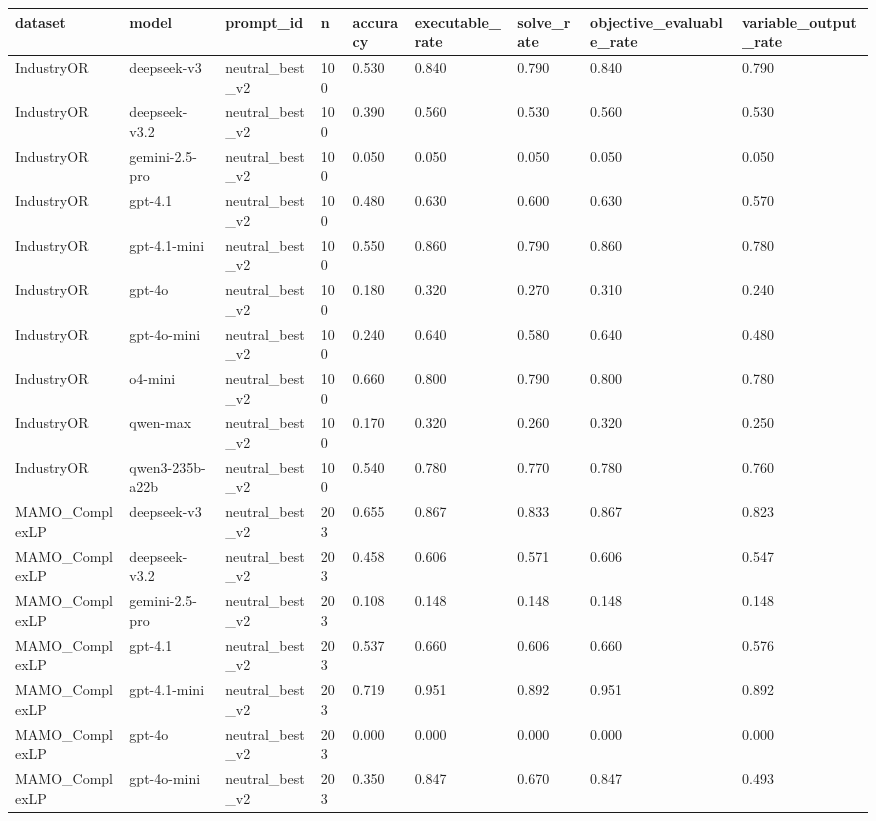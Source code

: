 \begin{table}[t]
\centering
\small
\begin{tabular}{lllllllll}
\toprule
dataset & model & prompt\_id & n & accuracy & executable\_rate & solve\_rate & objective\_evaluable\_rate & variable\_output\_rate \\
\midrule
IndustryOR & deepseek-v3 & neutral\_best\_v2 & 100 & 0.530 & 0.840 & 0.790 & 0.840 & 0.790 \\
IndustryOR & deepseek-v3.2 & neutral\_best\_v2 & 100 & 0.390 & 0.560 & 0.530 & 0.560 & 0.530 \\
IndustryOR & gemini-2.5-pro & neutral\_best\_v2 & 100 & 0.050 & 0.050 & 0.050 & 0.050 & 0.050 \\
IndustryOR & gpt-4.1 & neutral\_best\_v2 & 100 & 0.480 & 0.630 & 0.600 & 0.630 & 0.570 \\
IndustryOR & gpt-4.1-mini & neutral\_best\_v2 & 100 & 0.550 & 0.860 & 0.790 & 0.860 & 0.780 \\
IndustryOR & gpt-4o & neutral\_best\_v2 & 100 & 0.180 & 0.320 & 0.270 & 0.310 & 0.240 \\
IndustryOR & gpt-4o-mini & neutral\_best\_v2 & 100 & 0.240 & 0.640 & 0.580 & 0.640 & 0.480 \\
IndustryOR & o4-mini & neutral\_best\_v2 & 100 & 0.660 & 0.800 & 0.790 & 0.800 & 0.780 \\
IndustryOR & qwen-max & neutral\_best\_v2 & 100 & 0.170 & 0.320 & 0.260 & 0.320 & 0.250 \\
IndustryOR & qwen3-235b-a22b & neutral\_best\_v2 & 100 & 0.540 & 0.780 & 0.770 & 0.780 & 0.760 \\
MAMO\_ComplexLP & deepseek-v3 & neutral\_best\_v2 & 203 & 0.655 & 0.867 & 0.833 & 0.867 & 0.823 \\
MAMO\_ComplexLP & deepseek-v3.2 & neutral\_best\_v2 & 203 & 0.458 & 0.606 & 0.571 & 0.606 & 0.547 \\
MAMO\_ComplexLP & gemini-2.5-pro & neutral\_best\_v2 & 203 & 0.108 & 0.148 & 0.148 & 0.148 & 0.148 \\
MAMO\_ComplexLP & gpt-4.1 & neutral\_best\_v2 & 203 & 0.537 & 0.660 & 0.606 & 0.660 & 0.576 \\
MAMO\_ComplexLP & gpt-4.1-mini & neutral\_best\_v2 & 203 & 0.719 & 0.951 & 0.892 & 0.951 & 0.892 \\
MAMO\_ComplexLP & gpt-4o & neutral\_best\_v2 & 203 & 0.000 & 0.000 & 0.000 & 0.000 & 0.000 \\
MAMO\_ComplexLP & gpt-4o-mini & neutral\_best\_v2 & 203 & 0.350 & 0.847 & 0.670 & 0.847 & 0.493 \\

\end{tabular}
\end{table}
